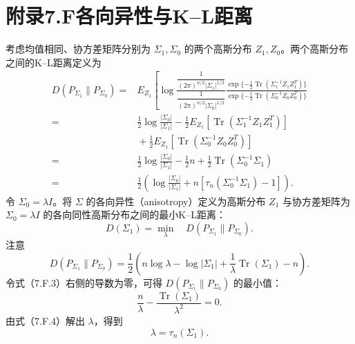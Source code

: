 \section*{附录7.F\quad 各向异性与K–L距离}

考虑均值相同、协方差矩阵分别为 $\Sigma_1,\Sigma_0$ 的两个高斯分布 $Z_1,Z_0$。两个高斯分布之间的K–L距离定义为
\begin{equation}
\begin{aligned}
D(P_{\Sigma_1}\parallel P_{\Sigma_0})
={}&E_{Z_1}\left[\log
 \frac{\dfrac1{(2\pi)^{n/2}|\Sigma_1|^{1/2}}}
 {\dfrac1{(2\pi)^{n/2}|\Sigma_0|^{1/2}}}
 \frac{\exp\{-\tfrac12\operatorname{Tr}(\Sigma_1^{-1}Z_1Z_1^T)\}}
 {\exp\{-\tfrac12\operatorname{Tr}(\Sigma_0^{-1}Z_0Z_0^T)\}}\right.\\
={}&\frac12\log\frac{|\Sigma_0|}{|\Sigma_1|}
 -\frac12E_{Z_1}[\operatorname{Tr}(\Sigma_1^{-1}Z_1Z_1^T)]\\
&{}+\frac12E_{Z_1}[\operatorname{Tr}(\Sigma_0^{-1}Z_0Z_0^T)]\\
={}&\frac12\log\frac{|\Sigma_0|}{|\Sigma_1|}
 -\frac12n+\frac12\operatorname{Tr}(\Sigma_0^{-1}\Sigma_1)\\
={}&\frac12\left(\log\frac{|\Sigma_0|}{|\Sigma_1|}
 +n[\tau_n(\Sigma_0^{-1}\Sigma_1)-1]\right).
\end{aligned}\tag{7.F.1}
\end{equation}
令 $\Sigma_0=\lambda I$。将 $\Sigma$ 的各向异性（anisotropy）定义为高斯分布 $Z_1$ 与协方差矩阵为 $\Sigma_0=\lambda I$ 的各向同性高斯分布之间的最小K–L距离：
\begin{equation}
D(\Sigma_1)=\min_\lambda\quad D(P_{\Sigma_1}\parallel P_{\Sigma_0}).\tag{7.F.2}
\end{equation}
注意
\begin{equation}
D(P_{\Sigma_1}\parallel P_{\Sigma_0})
 =\frac12\left(n\log\lambda-\log|\Sigma_1|
 +\frac1\lambda\operatorname{Tr}(\Sigma_1)-n\right).\tag{7.F.3}
\end{equation}
令式（7.F.3）右侧的导数为零，可得 $D(P_{\Sigma_1}\parallel P_{\Sigma_0})$ 的最小值：
\begin{equation}
\frac n\lambda-\frac{\operatorname{Tr}(\Sigma_1)}{\lambda^2}=0.\tag{7.F.4}
\end{equation}
由式（7.F.4）解出 $\lambda$，得到
\begin{equation}
\lambda=\tau_n(\Sigma_1).\tag{7.F.5}
\end{equation}
